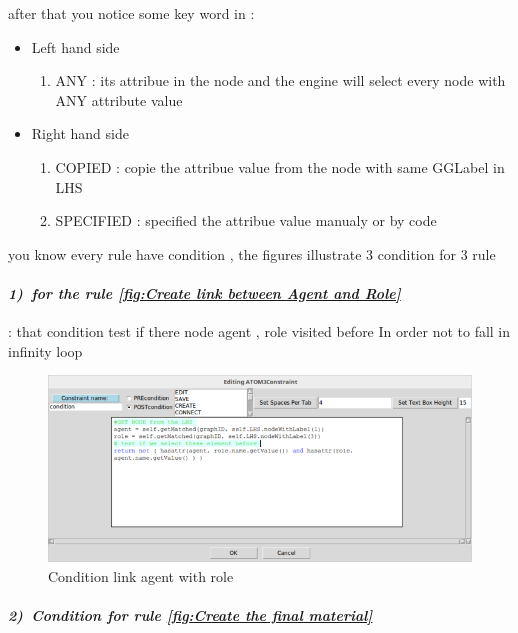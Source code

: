 after that you notice some key word in  :
\begin{itemize}
\item Left hand side
	\begin{enumerate}
	\item ANY : its attribue in the node and the engine will select every node with ANY attribute value
	\end{enumerate}
\item  Right hand side
	\begin{enumerate}
	\item COPIED : copie the attribue value from the node with same GGLabel in LHS
	\item SPECIFIED : specified the attribue value manualy or by code 
	\end{enumerate}
\end{itemize}

\pagebreak
you know  every rule have condition , the figures illustrate 3 condition for 3 rule 

 
\paragraph{\emph{1)~for the rule \ref{fig:Create link between Agent and Role} } } 
 : 
\vspace{0.5cm}
that condition test if there node agent , role visited before 
In order not to fall in infinity loop 

\vspace{0.5cm}
\begin{figure}[th]
	\centering
 	\includegraphics[scale=0.5]{chapiter3/img/condrule1}
	\caption{\label{fig:Condition link agent with role}Condition link agent with role  }
\end{figure} 

\paragraph{\emph{2)~Condition for rule \ref{fig:Create the final material} } } 
 
